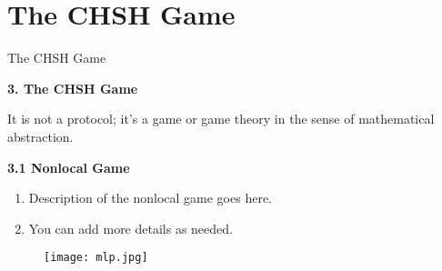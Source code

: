 \documentclass[12pt, aspectratio=169]{beamer}
\begin{document}
\section{The CHSH Game}
\begin{frame}{The CHSH Game}



\textbf{3. The CHSH Game}

It is not a protocol; it's a game or game theory in the sense of mathematical abstraction.

\textbf{3.1 Nonlocal Game}

\begin{enumerate}
    \item Description of the nonlocal game goes here.
    \item You can add more details as needed.
\end{enumerate}
\begin{figure}[h]
    \centering
    \texttt{[image: mlp.jpg]}
   
\end{figure}


\end{frame}    
\end{document}
